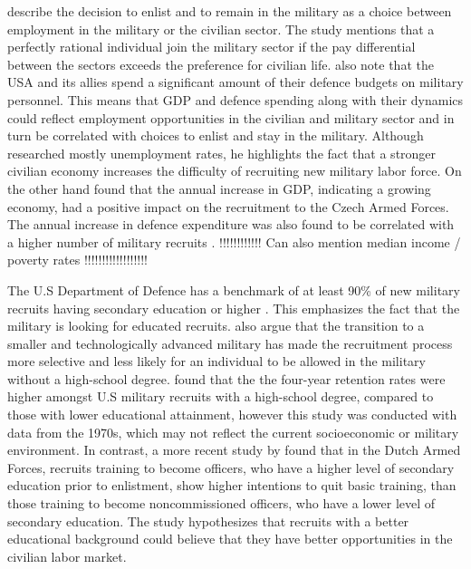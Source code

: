 \textcite{warner_chapter_1995} describe the decision to enlist and to remain in the military
as a choice between employment in the military or the civilian sector. The study 
mentions that a perfectly rational individual join the military sector if the pay
differential between the sectors exceeds the preference for civilian life. \textcite{warner_chapter_1995} 
also note that the USA and its allies spend a significant amount of 
their defence budgets on military personnel. This means that GDP and defence spending 
along with their dynamics could reflect employment opportunities in the civilian and 
military sector and in turn be correlated with choices to enlist and stay in the military.
Although \textcite{backstrom_are_2019} researched mostly unemployment rates, he highlights 
the fact that a stronger civilian economy increases the difficulty of recruiting new military 
labor force. On the other hand \textcite{holcner_military_2021} found that the annual 
increase in GDP, indicating a growing economy, had a positive impact on the recruitment to the 
Czech Armed Forces. The annual increase in defence expenditure was also found to be 
correlated with a higher number of military recruits \parencite{holcner_military_2021}.
!!!!!!!!!!!! Can also mention median income / poverty rates !!!!!!!!!!!!!!!!!!

The U.S Department of Defence has a benchmark of at least 90\% of new military recruits 
having secondary education or higher \parencite{cnas_resources_and_force_readiness_division_fiscal_nodate}.
This emphasizes the fact that the military is looking for educated recruits. \textcite{asoni_rich_2013} 
also argue that the transition to a smaller and technologically advanced military has 
made the recruitment process more selective and less likely for an individual to 
be allowed in the military without a high-school degree. \textcite{elster_study_1982} 
found that the the four-year retention rates were higher amongst U.S military recruits 
with a high-school degree, compared to those with lower educational attainment, however 
this study was conducted with data from the 1970s, which may not reflect the current 
socioeconomic or military environment. 
In contrast, a more recent study by \textcite{hof_quality_2023} found that in the 
Dutch Armed Forces, recruits training to become officers, who have a higher level of 
secondary education prior to enlistment, show higher intentions to quit basic training, 
than those training to become noncommissioned officers, who have a lower level of 
secondary education. The study hypothesizes that recruits with a better educational 
background could believe that they have better opportunities in the civilian labor market.

